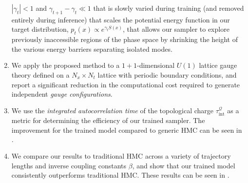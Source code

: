 \documentclass{article} %
\begin{document}
\begin{enumerate}
      \(|\gamma_{t}|<1\) and \(\gamma_{t+1} - \gamma_{t} \ll 1\) that is slowly varied during training (and removed
      entirely during inference) that scales the potential energy function in our target distribution, \(p_{t}(x)\propto
      e^{\gamma_{t}S(x)}\), that allows our sampler to explore previously inaccessible regions of the phase space by
      shrinking the height of the various energy barriers separating isolated modes.
   \item We apply the proposed method to a \(1+1\)-dimensional \(U(1)\) lattice gauge theory defined on a
      \(N_{x}\times N_{t}\) lattice with periodic boundary conditions, and report a significant reduction in the
      computational cost required to generate independent \emph{gauge configurations}.
   \item We use the \emph{integrated autocorrelation time} of the topological charge
      \(\tau_{\mathrm{int}}^{\mathcal{Q}}\) as a metric for determining the efficiency of our trained sampler.
      The improvement for the trained model compared to generic HMC can be seen in .
   \item We compare our results to traditional HMC across a variety of trajectory lengths and inverse coupling
      constants \(\beta\), and show that our trained model consistently outperforms traditional HMC.\@
      These results can be seen in .
\end{enumerate}
%
\end{document}
